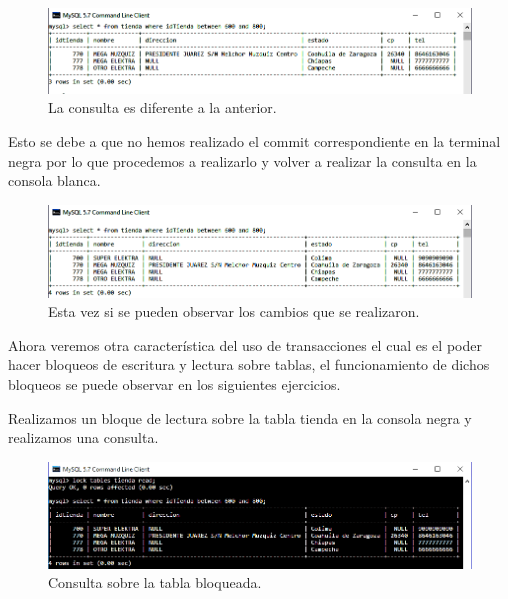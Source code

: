 \documentclass[12pt, titlepage]{article}
\begin{document}
	\begin{figure}[H]
		\begin{center}
			\includegraphics[width=\textwidth]{img/nueve.png}
			\caption{La consulta es diferente a la anterior.}
			\label{fig:nueve}
		\end{center}
	\end{figure}

	Esto se debe a que no hemos realizado el commit correspondiente en la terminal negra por lo que procedemos a realizarlo y volver a realizar la consulta en la consola blanca.
	
	\begin{figure}[H]
		\begin{center}
			\includegraphics[width=\textwidth]{img/diez.png}
			\caption{Esta vez si se pueden observar los cambios que se realizaron.}
			\label{fig:diez}
		\end{center}
	\end{figure}

	Ahora veremos otra característica del uso de transacciones el cual es el poder hacer bloqueos de escritura y lectura sobre tablas, el funcionamiento de dichos bloqueos se puede observar en los siguientes ejercicios.
	
	Realizamos un bloque de lectura sobre la tabla tienda en la consola negra y realizamos una consulta.
	
	\begin{figure}[H]
		\begin{center}
			\includegraphics[width=\textwidth]{img/once.png}
			\caption{Consulta sobre la tabla bloqueada.}
			\label{fig:once}
		\end{center}
	\end{figure}
	
\end{document}
